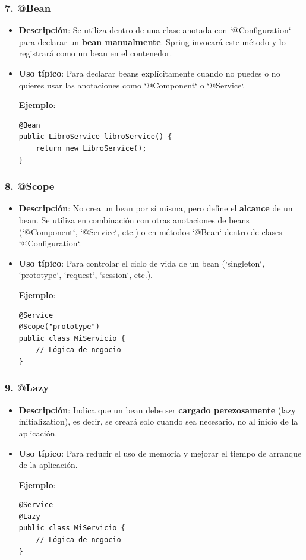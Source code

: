 \documentclass[11pt]{article}
\begin{document}
\subsubsection{7. \textbf{\textbf{@Bean}}}
\label{sec:org3c2e231}
\begin{itemize}
\item \textbf{\textbf{Descripción}}: Se utiliza dentro de una clase anotada con `@Configuration` para declarar un \textbf{\textbf{bean manualmente}}. Spring invocará este método y lo registrará como un bean en el contenedor.
\item \textbf{\textbf{Uso típico}}: Para declarar beans explícitamente cuando no puedes o no quieres usar las anotaciones como `@Component` o `@Service`.

\textbf{\textbf{Ejemplo}}:
\begin{verbatim}
@Bean
public LibroService libroService() {
    return new LibroService();
}
\end{verbatim}
\end{itemize}

\subsubsection{8. \textbf{\textbf{@Scope}}}
\label{sec:org761f64c}
\begin{itemize}
\item \textbf{\textbf{Descripción}}: No crea un bean por sí misma, pero define el \textbf{\textbf{alcance}} de un bean. Se utiliza en combinación con otras anotaciones de beans (`@Component`, `@Service`, etc.) o en métodos `@Bean` dentro de clases `@Configuration`.
\item \textbf{\textbf{Uso típico}}: Para controlar el ciclo de vida de un bean (`singleton`, `prototype`, `request`, `session`, etc.).

\textbf{\textbf{Ejemplo}}:
\begin{verbatim}
@Service
@Scope("prototype")
public class MiServicio {
    // Lógica de negocio
}
\end{verbatim}
\end{itemize}

\subsubsection{9. \textbf{\textbf{@Lazy}}}
\label{sec:org00c32a7}
\begin{itemize}
\item \textbf{\textbf{Descripción}}: Indica que un bean debe ser \textbf{\textbf{cargado perezosamente}} (lazy initialization), es decir, se creará solo cuando sea necesario, no al inicio de la aplicación.
\item \textbf{\textbf{Uso típico}}: Para reducir el uso de memoria y mejorar el tiempo de arranque de la aplicación.

\textbf{\textbf{Ejemplo}}:
\begin{verbatim}
@Service
@Lazy
public class MiServicio {
    // Lógica de negocio
}
\end{verbatim}
\end{itemize}
\end{document}
